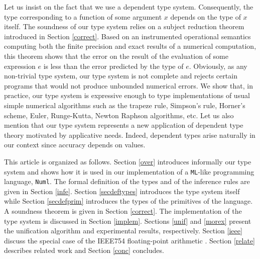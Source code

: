 Let us insist on the fact that we use a dependent type system. Consequently, the type corresponding to a function of some argument $x$ 
 depends on the type of $x$ itself. 
The soundness of our type system relies on a subject reduction theorem introduced in Section \ref{correct}.
Based on an instrumented operational semantics computing both the finite precision and exact results
of a numerical computation,  this theorem shows that the error on the result of the evaluation of some expression $e$ is less 
than the error predicted by the type of $e$.
Obviously, as any non-trivial type system, our type system is not complete and rejects certain
 programs that would not produce unbounded numerical errors. 
 We show that, in practice,  our type system  is expressive enough  to type implementations 
 of usual simple numerical algorithms \cite{Atk89} such as the trapeze rule, Simpson’s rule, Horner’s scheme, Euler, Runge-Kutta, Newton Raphson algorithms, etc. 
Let us also mention that our type system represents a new application of dependent type theory motivated
by applicative needs. Indeed, dependent types arise naturally in our context since accuracy depends on values.

This article is organized as follows. Section \ref{over} introduces informally our type system and shows how it is used in our implementation of 
a \texttt{ML}-like programming language, \texttt{Numl}.
The formal definition of the types and of the inference rules are given in Section \ref{infe}.
Section \ref{secdeftypes} introduces the type system itself while Section \ref{secdefprim}
introduces the types of the primitives of the language.
A soundness theorem is given in Section \ref{correct}. 
The implementation of the type system is discussed in Section \ref{implem}.
Sections \ref{unif} and \ref{morex} present the unification algorithm and experimental results, respectively.
Section \ref{ieee} discuss the special case of the IEEE754 floating-point arithmetic \cite{IEEE754}.
Section \ref{relate} describes related work 
 and Section \ref{conc} concludes.
